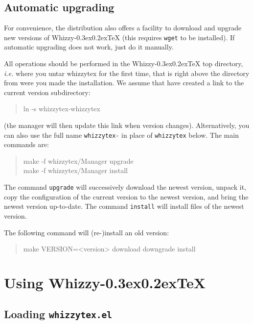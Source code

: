 \documentclass[12pt]{article}
\makeatletter
\let \lst \verb
\def \whizzy {{Whizzy\kern -0.3ex\raise 0.2ex\hbox{\let \@\relax\TeX}}}
\makeatother
\begin{document}
\subsection {Automatic upgrading}

For convenience, the distribution also offers a facility to download and
upgrade new versions of {\whizzy} (this requires \lst"wget" to be
installed).  If automatic upgrading does not work, just do it manually.

All operations should be performed in the {\whizzy} top directory, {\em
i.e.} where you untar whizzytex for the first time, that is right above the
directory from were you made the installation. We assume that have 
created a link to the current version subdirectory: 
\begin{quote}
\begin{tt}
ln -s whizzytex-\version\space whizzytex
\end{tt}
\end{quote}
(the manager will then update this link when version changes).
Alternatively, you can also use the full name {\tt whizzytex-\version} in
place of {\tt whizzytex} below. The main commands are:
\begin{quote}
\begin{tt}
make -f whizzytex/Manager upgrade \\
make -f whizzytex/Manager install
\end{tt}
\end{quote}
The command \lst"upgrade" will successively download the newest version,
unpack it, copy the configuration of the current version to the newest
version, and bring the newest version up-to-date. The command \lst"install"
will install files of the newest version. 

The following command will (re-)install an old version:
\begin{quote}
\begin{tt}
make VERSION=<version> download downgrade install
\end{tt}
\end{quote}

\section{Using {\whizzy}}
\label{using}

\subsection {Loading {\tt whizzytex.el}}
\end{document}
